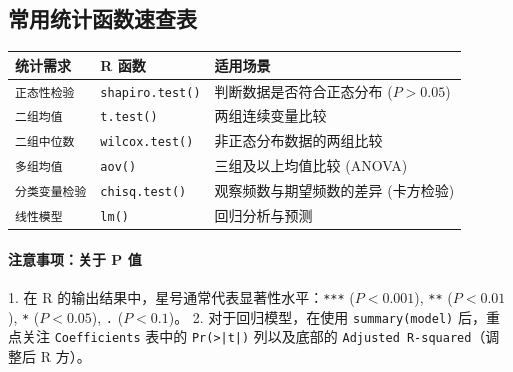 \subsection{常用统计函数速查表}
\begin{table}[h!]
\centering
\renewcommand{\arraystretch}{1.5}
\begin{tabular}{|l|l|p{6cm}|}
\hline
\textbf{统计需求} & \textbf{R 函数} & \textbf{适用场景} \\ \hline
\texttt{正态性检验} & \texttt{shapiro.test()} & 判断数据是否符合正态分布 ($P > 0.05$) \\ \hline
\texttt{二组均值} & \texttt{t.test()} & 两组连续变量比较 \\ \hline
\texttt{二组中位数} & \texttt{wilcox.test()} & 非正态分布数据的两组比较 \\ \hline
\texttt{多组均值} & \texttt{aov()} & 三组及以上均值比较 (ANOVA) \\ \hline
\texttt{分类变量检验} & \texttt{chisq.test()} & 观察频数与期望频数的差异 (卡方检验) \\ \hline
\texttt{线性模型} & \texttt{lm()} & 回归分析与预测 \\ \hline
\end{tabular}
\end{table}

\paragraph{注意事项：关于 P 值}
1. 在 R 的输出结果中，星号通常代表显著性水平：\texttt{***} ($P < 0.001$), \texttt{**} ($P < 0.01$), \texttt{*} ($P < 0.05$), \texttt{.} ($P < 0.1$)。
2. 对于回归模型，在使用 \texttt{summary(model)} 后，重点关注 \texttt{Coefficients} 表中的 \texttt{Pr(>|t|)} 列以及底部的 \texttt{Adjusted R-squared}（调整后 R 方）。